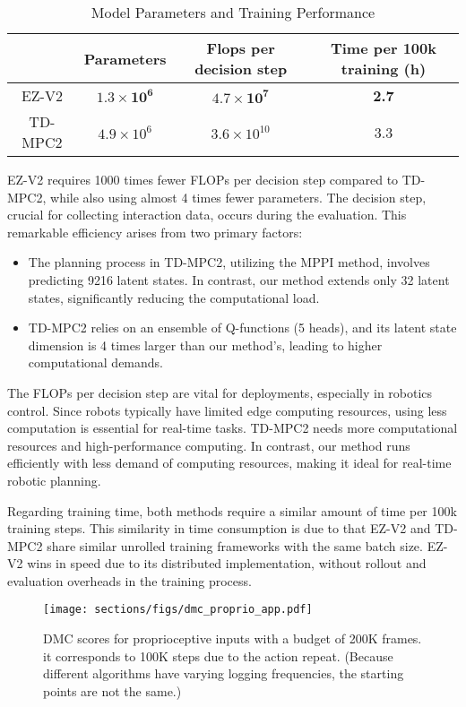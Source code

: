 \begin{table}[htbp]
    \centering
    \caption{Model Parameters and Training Performance}
    \begin{tabular}{|c|c|c|c|}
        \hline
        & Parameters & Flops per decision step & Time per 100k training (h) \\
        \hline
        EZ-V2 & $\mathbf{1.3 \times 10^6}$ & $\mathbf{4.7 \times 10^7}$ & \textbf{2.7} \\
        TD-MPC2 & $4.9 \times 10^6$ & $3.6 \times 10^{10}$ & 3.3 \\
        \hline
    \end{tabular}
\end{table}

EZ-V2 requires 1000 times fewer FLOPs per decision step compared to TD-MPC2, while also using almost 4 times fewer parameters. The decision step, crucial for collecting interaction data, occurs during the evaluation. This remarkable efficiency arises from two primary factors:
\begin{itemize}
    \item The planning process in TD-MPC2, utilizing the MPPI method, involves predicting 9216 latent states. In contrast, our method extends only 32 latent states, significantly reducing the computational load.
    \item TD-MPC2 relies on an ensemble of Q-functions (5 heads), and its latent state dimension is 4 times larger than our method's, leading to higher computational demands.
\end{itemize}

The FLOPs per decision step are vital for deployments, especially in robotics control. Since robots typically have limited edge computing resources, using less computation is essential for real-time tasks. TD-MPC2 needs more computational resources and high-performance computing. In contrast, our method runs efficiently with less demand of computing resources, making it ideal for real-time robotic planning.

Regarding training time, both methods require a similar amount of time per 100k training steps. This similarity in time consumption is due to that EZ-V2 and TD-MPC2 share similar unrolled training frameworks with the same batch size. EZ-V2 wins in speed due to its distributed implementation, without rollout and evaluation overheads in the training process.


\begin{figure}[t]
\centering
\texttt{[image: sections/figs/dmc\_proprio\_app.pdf]}
\caption{DMC scores for proprioceptive inputs with a budget of 200K frames. it corresponds to 100K steps due to the action repeat. (Because different algorithms have varying logging frequencies, the starting points are not the same.)}
\label{dmc_proprio}
\end{figure}


